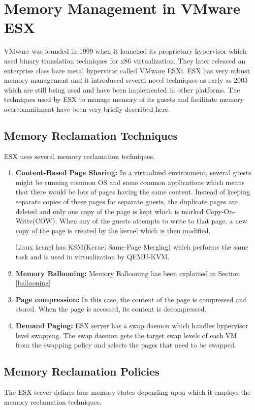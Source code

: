\section{Memory Management in VMware ESX}
VMware was founded in 1999 when it launched its proprietary hypervisor which used binary translation techniques for x86 virtualization. They later released an enterprise class bare metal hypervisor called VMware ESXi. ESX has very robust memory management and it introduced several novel techniques as early as 2003 which are still being used and have been implemented in other platforms. The techniques used by ESX to manage memory \cite{waldspurger2002memory} of its guests and facilitate memory overcommitment have been very briefly described here.

\subsection{Memory Reclamation Techniques}
ESX uses several memory reclamation techniques.
\begin{enumerate}
\item \textbf{Content-Based Page Sharing:} In a virtualized environment, several guests might be running common OS and some common applications which means that there would be lots of pages having the same content. Instead of keeping separate copies of these pages for separate guests, the duplicate pages are deleted and only one copy of the page is kept which is marked Copy-On-Write(COW). When any of the guests attempts to write to that page, a new copy of the page is created by the kernel which is then modified.

Linux kernel has KSM(Kernel Same-Page Merging) \cite{ksm} which performs the same task and is used in virtualization by QEMU-KVM.
\item \textbf{Memory Ballooning:} Memory Ballooning has been explained in Section \ref{ballooning}
\item \textbf{Page compression:} In this case, the content of the page is compressed and stored. When the page is accessed, its content is decompressed.
\item \textbf{Demand Paging:} ESX server has a swap daemon which handles hypervisor level swapping. The swap daemon gets the target swap levels of each VM from the swapping policy and selects the pages that need to be swapped. 

\end{enumerate}

\subsection{Memory Reclamation Policies}
The ESX server defines four memory states depending upon which it employs the memory reclamation techniques.

